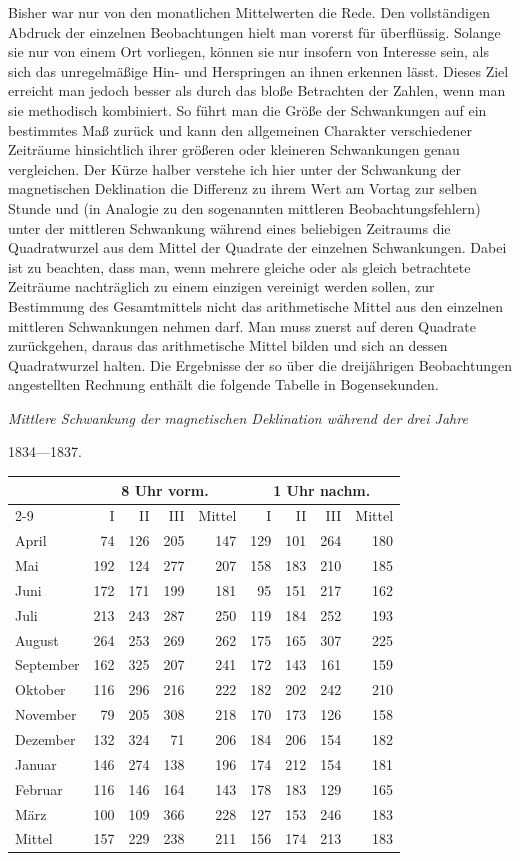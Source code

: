 Bisher war nur von den monatlichen Mittelwerten die Rede. Den vollständigen Abdruck der einzelnen Beobachtungen hielt man vorerst für überflüssig. Solange sie nur von einem Ort vorliegen, können sie nur insofern von Interesse sein, als sich das unregelmäßige Hin- und Herspringen an ihnen erkennen lässt. Dieses Ziel erreicht man jedoch besser als durch das bloße Betrachten der Zahlen, wenn man sie methodisch kombiniert. So führt man die Größe der Schwankungen auf ein bestimmtes Maß zurück und kann den allgemeinen Charakter verschiedener Zeiträume hinsichtlich ihrer größeren oder kleineren Schwankungen genau vergleichen. Der Kürze halber verstehe ich hier unter der Schwankung der magnetischen Deklination die Differenz zu ihrem Wert am Vortag zur selben Stunde und (in Analogie zu den sogenannten mittleren Beobachtungsfehlern) unter der mittleren Schwankung während eines beliebigen Zeitraums die Quadratwurzel aus dem Mittel der Quadrate der einzelnen Schwankungen. Dabei ist zu beachten, dass man, wenn mehrere gleiche oder als gleich betrachtete Zeiträume nachträglich zu einem einzigen vereinigt werden sollen, zur Bestimmung des Gesamtmittels nicht das arithmetische Mittel aus den einzelnen mittleren Schwankungen nehmen darf. Man muss zuerst auf deren Quadrate zurückgehen, daraus das arithmetische Mittel bilden und sich an dessen Quadratwurzel halten. Die Ergebnisse der so über die dreijährigen
Beobachtungen angestellten Rechnung enthält die folgende Tabelle in Bogensekunden.
\begin{center}\small
\textit{Mittlere Schwankung der magnetischen Deklination während der drei Jahre}\par
1834---1837.\par\smallskip
\begin{tabular}{l|r|r|r||r||r|r|r||r}
&\multicolumn{4}{c||}{8 Uhr vorm.}&\multicolumn{4}{c}{1 Uhr nachm.}\\\cline{2-9}
&I&II&III&Mittel&I&II&III&Mittel\\\hline
April&74&126&205&147&129&101&264&180\\
Mai&192&124&277&207&158&183&210&185\\
Juni&172&171&199&181&95&151&217&162\\
Juli&213&243&287&250&119&184&252&193\\
August&264&253&269&262&175&165&307&225\\
September&162&325&207&241&172&143&161&159\\
Oktober&116&296&216&222&182&202&242&210\\
November&79&205&308&218&170&173&126&158\\
Dezember&132&324&71&206&184&206&154&182\\
Januar&146&274&138&196&174&212&154&181\\
Februar&116&146&164&143&178&183&129&165\\
März&100&109&366&228&127&153&246&183\\\hline
Mittel&157&229&238&211&156&174&213&183
\end{tabular}
\end{center}

